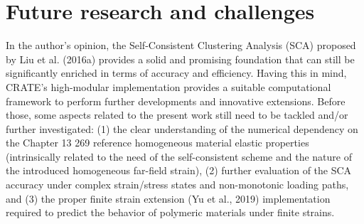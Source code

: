 \section{Future research and challenges}

In the author's opinion, the Self-Consistent Clustering Analysis (SCA) proposed by Liu et al. (2016a) provides a solid and promising foundation that can still be significantly enriched in terms of accuracy and efficiency. Having this in mind, CRATE's high-modular implementation provides a suitable computational framework to perform further developments and innovative extensions. Before those, some aspects related to the present work still need to be tackled and/or further investigated: (1) the clear understanding of the numerical dependency on the
Chapter 13
269
reference homogeneous material elastic properties (intrinsically related to the need of the self-consistent scheme and the nature of the introduced homogeneous far-field strain), (2) further evaluation of the SCA accuracy under complex strain/stress states and non-monotonic loading paths, and (3) the proper finite strain extension (Yu et al., 2019) implementation required to predict the behavior of polymeric materials under finite strains.
